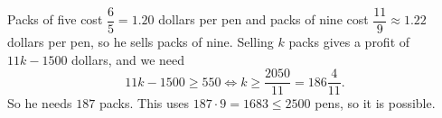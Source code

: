 Packs of five cost $\dfrac65=1.20$ dollars per pen and packs of nine cost $\dfrac{11}{9}\approx1.22$ dollars per pen, so he sells packs of nine. Selling $k$ packs gives a profit of $11k-1500$ dollars, and we need
\[11k-1500\ge550\iff k\ge\dfrac{2050}{11}=186\dfrac{4}{11}.\]
So he needs $\boxed{187}$ packs. This uses $187\cdot9=1683\le2500$ pens, so it is possible.
